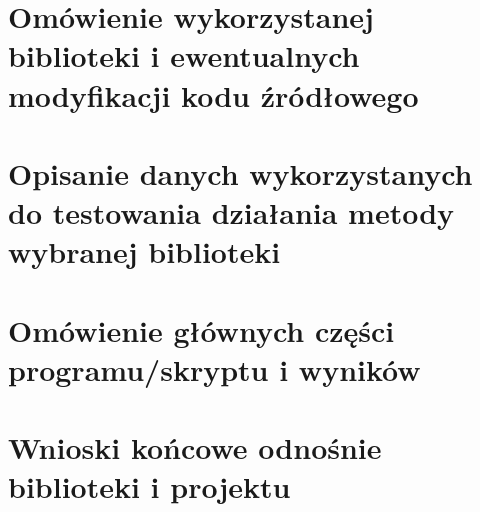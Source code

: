 \documentclass[10pt,a4paper]{article}
\begin{document}
\section{Omówienie wykorzystanej biblioteki i ewentualnych modyfikacji kodu źródłowego}

\section{Opisanie danych wykorzystanych do testowania działania metody wybranej biblioteki}

\section{Omówienie głównych części programu/skryptu i wyników}

\section{Wnioski końcowe odnośnie biblioteki i projektu}


\end{document}
